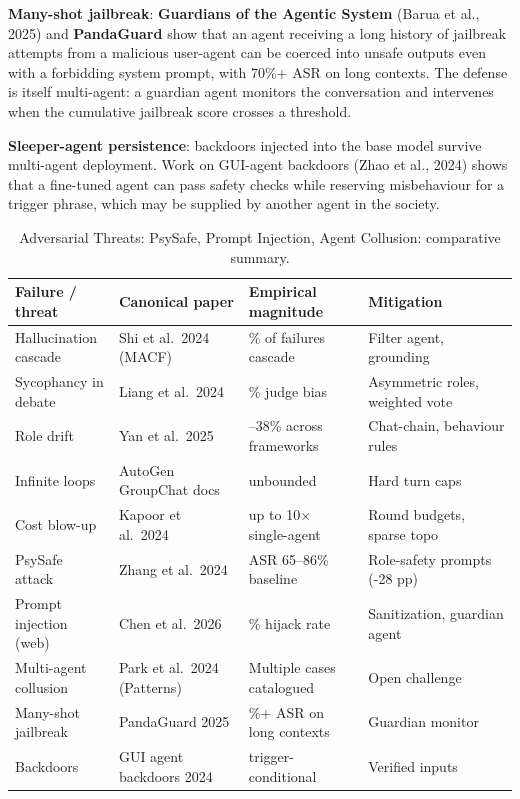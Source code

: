 \documentclass{article}
\begin{document}
\textbf{Many-shot jailbreak}: \textbf{Guardians of the Agentic System} (Barua et al., 2025) and \textbf{PandaGuard} \citep{shen2024smallllmsareweakto} show that an agent receiving a long history of jailbreak attempts from a malicious user-agent can be coerced into unsafe outputs even with a forbidding system prompt, with 70\%+ ASR on long contexts. The defense is itself multi-agent: a guardian agent monitors the conversation and intervenes when the cumulative jailbreak score crosses a threshold.

\textbf{Sleeper-agent persistence}: backdoors injected into the base model survive multi-agent deployment. Work on GUI-agent backdoors (Zhao et al., 2024) shows that a fine-tuned agent can pass safety checks while reserving misbehaviour for a trigger phrase, which may be supplied by another agent in the society.

\begin{table}[t]
\centering
\caption{Adversarial Threats: PsySafe, Prompt Injection, Agent Collusion: comparative summary.}
\label{tab:adversarial-threats-psysafe-prompt-injection-agent-collusion}
\begin{tabular}{>{\raggedright\arraybackslash}p{0.2095\linewidth}
  >{\raggedright\arraybackslash}p{0.2571\linewidth}
  >{\raggedright\arraybackslash}p{0.2381\linewidth}
  >{\raggedright\arraybackslash}p{0.2952\linewidth}}
\toprule
Failure / threat & Canonical paper & Empirical magnitude & Mitigation \\
\midrule
Hallucination cascade & Shi et al.~2024 (MACF) & 22\% of failures cascade & Filter agent, grounding \\
Sycophancy in debate & Liang et al.~2024 & 17\% judge bias & Asymmetric roles, weighted vote \\
Role drift & Yan et al.~2025 & 4--38\% across frameworks & Chat-chain, behaviour rules \\
Infinite loops & AutoGen GroupChat docs & unbounded & Hard turn caps \\
Cost blow-up & Kapoor et al.~2024 & up to 10× single-agent & Round budgets, sparse topo \\
PsySafe attack & Zhang et al.~2024 & ASR 65--86\% baseline & Role-safety prompts (-28 pp) \\
Prompt injection (web) & Chen et al.~2026 & 41\% hijack rate & Sanitization, guardian agent \\
Multi-agent collusion & Park et al.~2024 (Patterns) & Multiple cases catalogued & Open challenge \\
Many-shot jailbreak & PandaGuard 2025 & 70\%+ ASR on long contexts & Guardian monitor \\
Backdoors & GUI agent backdoors 2024 & trigger-conditional & Verified inputs \\
\end{tabular}
\end{table}
\end{document}
